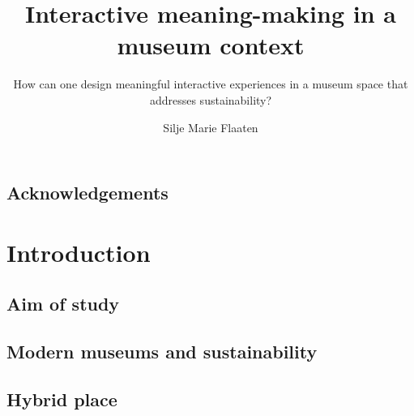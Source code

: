 \documentclass[UKenglish]{ifimaster}
\title{Interactive meaning-making in a museum context}
\subtitle{How can one design meaningful interactive experiences in a museum space that addresses sustainability?}
\author{Silje Marie Flaaten}
\begin{document}
\duoforside[dept={Department of Informatics}, program={Informatics: design, use, interaction},long]

\frontmatter{}
\chapter*{Acknowledgements}


%

\tableofcontents{}
\listoffigures{}

% 

\mainmatter{}
\part{Introduction}
\chapter{Aim of study}



\chapter{Modern museums and sustainability}


% 



\chapter{Hybrid place}

\end{document}
